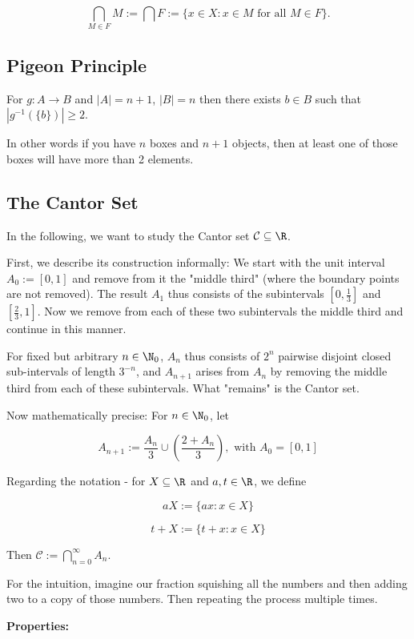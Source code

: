 \[
	\bigcap_{M \in F} M := \bigcap F := \{ x \in X : x \in M \text{ for all } M \in F \} .
\]

\subsection{Pigeon Principle}

For \(g: A \to B\) and \(|A| = n + 1\), \(|B| = n\) then there exists \(b \in B\) such that \(|g^{-1}(\{ b \})| \ge 2\). 

In other words if you have \(n\) boxes and \(n + 1\) objects, then at least one of those boxes will have more than 2 elements.

\subsection{The Cantor Set}

In the following, we want to study the Cantor set \(\mathcal{C}\subseteq\R\).

First, we describe its construction informally: We start with the unit interval \(A_0:=[0,1]\) and remove from it the "middle third" (where the boundary points are not removed). The result \(A_1\) thus consists of the subintervals \(\left[0,\frac{1}{3}\right]\) and \(\left[\frac{2}{3},1\right]\). Now we remove from each of these two subintervals the middle third and continue in this manner.

For fixed but arbitrary \(n\in\N_0\), \(A_n\) thus consists of \(2^n\) pairwise disjoint closed sub-intervals of length \(3^{-n}\), and \(A_{n+1}\) arises from \(A_n\) by removing the middle third from each of these subintervals. What "remains" is the Cantor set.

Now mathematically precise: For \(n\in\N_0\), let 

\[
	A_{n+1}:=\frac{A_n}{3} \cup (\frac{2+A_n}{3}), \text{ with } A_0 = [0,1]
\]
	
Regarding the notation - for \(X\subseteq\R\) and \(a,t\in\R\), we define

\[
    aX:=\{ax:x\in X\}
\]

\[
    t+X:=\{t+x:x\in X\}
\]

Then \(\mathcal{C}:=\bigcap_{n=0}^\infty A_n\).

For the intuition, imagine our fraction squishing all the numbers and then adding two to a copy of those numbers. Then repeating 
the process multiple times.

\textbf{Properties:}

